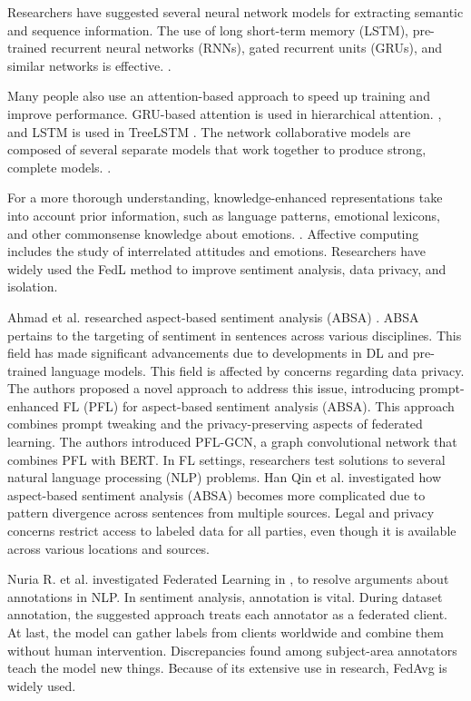 Researchers have suggested several neural network models for extracting semantic and sequence information. The use of long short-term memory (LSTM), pre-trained recurrent neural networks (RNNs), gated recurrent units (GRUs), and similar networks is effective. \cite{ref62}.

Many people also use an attention-based approach to speed up training and improve performance. GRU-based attention is used in hierarchical attention. \cite{ref63}, and LSTM is used in TreeLSTM \cite{ref64}. The network collaborative models are composed of several separate models that work together to produce strong, complete models. \cite{ref55}.

For a more thorough understanding, knowledge-enhanced representations take into account prior information, such as language patterns, emotional lexicons, and other commonsense knowledge about emotions. \cite{ref65}. Affective computing includes the study of interrelated attitudes and emotions. Researchers have widely used the FedL method to improve sentiment analysis, data privacy, and isolation.

Ahmad et al. researched aspect-based sentiment analysis (ABSA) \cite{ref66} \cite{ref18}. ABSA pertains to the targeting of sentiment in sentences across various disciplines. This field has made significant advancements due to developments in DL and pre-trained language models. This field is affected by concerns regarding data privacy. The authors proposed a novel approach to address this issue, introducing prompt-enhanced FL (PFL) for aspect-based sentiment analysis (ABSA). This approach combines prompt tweaking and the privacy-preserving aspects of federated learning. The authors introduced PFL-GCN, a graph convolutional network that combines PFL with BERT.\cite{ref67} In FL settings, researchers test solutions to several natural language processing (NLP) problems.\cite{ref68} Han Qin et al. investigated how aspect-based sentiment analysis (ABSA) becomes more complicated due to pattern divergence across sentences from multiple sources. Legal and privacy concerns restrict access to labeled data for all parties, even though it is available across various locations and sources.

Nuria R. et al. investigated Federated Learning in \cite{ref69}, to resolve arguments about annotations in NLP. In sentiment analysis, annotation is vital. During dataset annotation, the suggested approach treats each annotator as a federated client. At last, the model can gather labels from clients worldwide and combine them without human intervention. Discrepancies found among subject-area annotators teach the model new things. Because of its extensive use in research, FedAvg is widely used.

